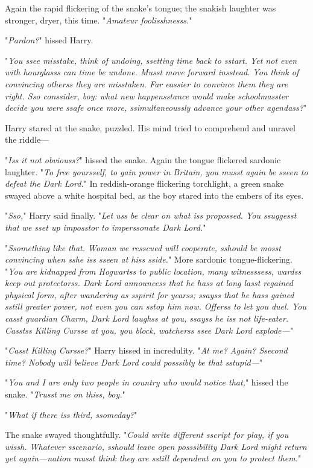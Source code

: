 Again the rapid flickering of the snake's tongue; the snakish laughter was 
stronger, dryer, this time. "\emph{Amateur foolisshnesss.}"

"\emph{Pardon?}" hissed Harry.

"\emph{You ssee misstake, think of undoing, ssetting time back to sstart. Yet 
not even with hourglasss can time be undone. Musst move forward insstead. You 
think of convincing otherss they are misstaken. Far eassier to convince them 
they are right. Sso conssider, boy: what new happensstance would make 
schoolmasster decide you were ssafe once more, ssimultaneoussly advance your 
other agendass?}"

Harry stared at the snake, puzzled. His mind tried to comprehend and unravel 
the riddle---

"\emph{Iss it not obviouss?}" hissed the snake. Again the tongue flickered 
sardonic laughter. "\emph{To free yoursself, to gain power in Britain, you 
musst again be sseen to defeat the Dark Lord.}"
\sbreak
In reddish-orange flickering torchlight, a green snake swayed above a white 
hospital bed, as the boy stared into the embers of its eyes.

"\emph{Sso,}" Harry said finally. "\emph{Let uss be clear on what iss 
propossed. You ssuggesst that we sset up imposstor to imperssonate Dark Lord.}"

"\emph{Ssomething like that. Woman we resscued will cooperate, sshould be mosst 
convincing when sshe iss sseen at hiss sside.}" More sardonic 
tongue-flickering. "\emph{You are kidnapped from Hogwartss to public location, 
many witnesssess, wardss keep out protectorss. Dark Lord announcess that he 
hass at long lasst regained physical form, after wandering as sspirit for 
yearss; ssayss that he hass gained sstill greater power, not even you can sstop 
him now. Offerss to let you duel. You casst guardian Charm, Dark Lord laughss 
at you, ssayss he iss not life-eater. Casstss Killing Cursse at you, you block, 
watcherss ssee Dark Lord explode---}"

"\emph{Casst Killing Cursse?}" Harry hissed in incredulity. "\emph{At me? 
Again? Ssecond time? Nobody will believe Dark Lord could posssibly be that 
sstupid---}"

"\emph{You and I are only two people in country who would notice that,}" hissed 
the snake. "\emph{Trusst me on thiss, boy.}"

"\emph{What if there iss third, ssomeday?}"

The snake swayed thoughtfully. "\emph{Could write different sscript for play, 
if you wissh. Whatever sscenario, sshould leave open posssibility Dark Lord 
might return yet again---nation musst think they are sstill dependent on you to 
protect them.}"

